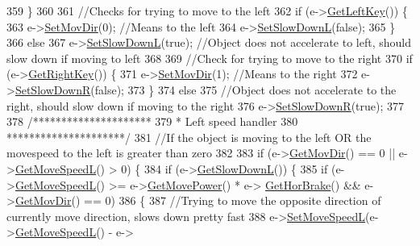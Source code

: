 \begin{DoxyCode}
359     \}
360 
361     \textcolor{comment}{//Checks for trying to move to the left}
362     \textcolor{keywordflow}{if} (e->\hyperlink{classAI_a0d8e57db11f22335ef2a7dcf3408ea6b}{GetLeftKey}()) \{
363         e->\hyperlink{classAI_a7b1fa9a0546e462e633bbdcbbf12eb50}{SetMovDir}(0); \textcolor{comment}{//Means to the left}
364         e->\hyperlink{classAI_ab07dcb050c20c646927e16e2ead40728}{SetSlowDownL}(\textcolor{keyword}{false});
365     \}
366     \textcolor{keywordflow}{else}
367         e->\hyperlink{classAI_ab07dcb050c20c646927e16e2ead40728}{SetSlowDownL}(\textcolor{keyword}{true}); \textcolor{comment}{//Object does not accelerate to left, should slow down if moving
       to left}
368 
369     \textcolor{comment}{//Check for trying to move to the right}
370     \textcolor{keywordflow}{if} (e->\hyperlink{classAI_aeb518aba00b996380158b247aa1dca7f}{GetRightKey}()) \{
371         e->\hyperlink{classAI_a7b1fa9a0546e462e633bbdcbbf12eb50}{SetMovDir}(1); \textcolor{comment}{//Means to the right}
372         e->\hyperlink{classAI_a57045e1587ca559b44019190a2433e07}{SetSlowDownR}(\textcolor{keyword}{false});
373     \}
374     \textcolor{keywordflow}{else}
375         \textcolor{comment}{//Object does not accelerate to the right, should slow down if moving to the right}
376         e->\hyperlink{classAI_a57045e1587ca559b44019190a2433e07}{SetSlowDownR}(\textcolor{keyword}{true});
377 
378     \textcolor{comment}{/*********************}
379 \textcolor{comment}{     * Left speed handler}
380 \textcolor{comment}{     *********************/}
381     \textcolor{comment}{//If the object is moving to the left OR the movespeed to the left is greater than zero}
382 
383     \textcolor{keywordflow}{if} (e->\hyperlink{classAI_af44b60f433e7046939fa564f17e4655f}{GetMovDir}() == 0 || e->\hyperlink{classAI_a727dd212a4f6dea5030399943b66a285}{GetMoveSpeedL}() > 0) \{
384         \textcolor{keywordflow}{if} (e->\hyperlink{classAI_ab0d09d0379209305cdbedff71615be8e}{GetSlowDownL}()) \{
385             \textcolor{keywordflow}{if} (e->\hyperlink{classAI_a727dd212a4f6dea5030399943b66a285}{GetMoveSpeedL}() >= e->\hyperlink{classAI_aa6c83658cc7028645288d90dac360ba4}{GetMovePower}() * e->
      \hyperlink{classAI_a492eb8602d131ddd7d1002a5175c677b}{GetHorBrake}() && e->\hyperlink{classAI_af44b60f433e7046939fa564f17e4655f}{GetMovDir}() == 0)
386             \{
387                 \textcolor{comment}{//Trying to move the opposite direction of currently move direction, slows down pretty fast}
388                 e->\hyperlink{classAI_a7e52788a6f93f78feaa0c8867f454888}{SetMoveSpeedL}(e->\hyperlink{classAI_a727dd212a4f6dea5030399943b66a285}{GetMoveSpeedL}() - e->

\end{DoxyCode}
